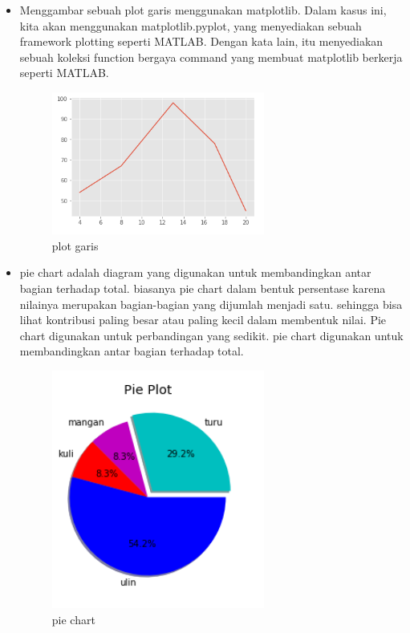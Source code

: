 \begin{itemize}
\item Menggambar sebuah plot garis menggunakan matplotlib. Dalam kasus ini, kita akan menggunakan matplotlib.pyplot, yang menyediakan sebuah framework plotting seperti MATLAB. Dengan kata lain, itu menyediakan sebuah koleksi function bergaya command yang membuat matplotlib berkerja seperti MATLAB.

\begin{figure}[H]
\centering
\includegraphics[width=7cm]{figures/6/1174009/1a.png}
\caption{plot garis}
\label{dwiyul}
\end{figure}

\item pie chart adalah diagram yang digunakan untuk membandingkan antar bagian terhadap total. biasanya pie chart dalam bentuk persentase karena nilainya merupakan bagian-bagian yang dijumlah menjadi satu. sehingga bisa lihat kontribusi paling besar atau paling kecil dalam membentuk nilai. Pie chart digunakan untuk perbandingan yang sedikit. pie chart digunakan untuk membandingkan antar bagian terhadap total.

\begin{figure}[H]
\centering
\includegraphics[width=7cm]{figures/6/1174009/1d.png}
\caption{pie chart}
\label{dwiyul}
\end{figure}


\end{itemize}
